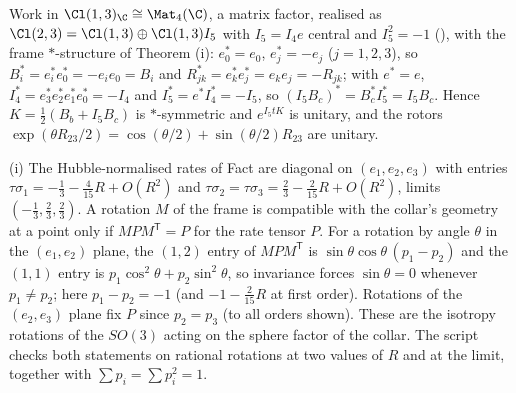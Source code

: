 Work in $\Cl(1,3)_{\C} \cong \Mat_{4}(\C)$, a matrix factor, realised as $\Cl(2,3) = \Cl(1,3) \oplus \Cl(1,3)I_{5}$ with $I_{5} = I_{4}e$ central and $I_{5}^{2} = -1$ (), with the frame $*$-structure of Theorem (i): $e_{0}^{*} = e_{0}$, $e_{j}^{*} = -e_{j}$ ($j = 1, 2, 3$), so $B_{i}^{*} = e_{i}^{*}e_{0}^{*} = -e_{i}e_{0} = B_{i}$ and $R_{jk}^{*} = e_{k}^{*}e_{j}^{*} = e_{k}e_{j} = -R_{jk}$; with $e^{*} = e$, $I_{4}^{*} = e_{3}^{*}e_{2}^{*}e_{1}^{*}e_{0}^{*} = -I_{4}$ and $I_{5}^{*} = e^{*}I_{4}^{*} = -I_{5}$, so $(I_{5}B_{c})^{*} = B_{c}^{*}I_{5}^{*} = I_{5}B_{c}$. Hence $K = \tfrac12(B_{b} + I_{5}B_{c})$ is $*$-symmetric and $e^{I_{5}tK}$ is unitary, and the rotors $\exp(\theta R_{23}/2) = \cos(\theta/2) + \sin(\theta/2)R_{23}$ are unitary.

(i) The Hubble-normalised rates of Fact  are diagonal on $(e_{1}, e_{2}, e_{3})$ with entries $\tau\sigma_{1} = -\tfrac13 - \tfrac{4}{15}R + O(R^{2})$ and $\tau\sigma_{2} = \tau\sigma_{3} = \tfrac23 - \tfrac{2}{15}R + O(R^{2})$, limits $(-\tfrac13, \tfrac23, \tfrac23)$. A rotation $M$ of the frame is compatible with the collar's geometry at a point only if $MPM^{\mathsf T} = P$ for the rate tensor $P$. For a rotation by angle $\theta$ in the $(e_{1}, e_{2})$ plane, the $(1,2)$ entry of $MPM^{\mathsf T}$ is $\sin\theta\cos\theta\,(p_{1} - p_{2})$ and the $(1,1)$ entry is $p_{1}\cos^{2}\theta + p_{2}\sin^{2}\theta$, so invariance forces $\sin\theta = 0$ whenever $p_{1} \ne p_{2}$; here $p_{1} - p_{2} = -1$ (and $-1 - \tfrac{2}{15}R$ at first order). Rotations of the $(e_{2}, e_{3})$ plane fix $P$ since $p_{2} = p_{3}$ (to all orders shown). These are the isotropy rotations of the $SO(3)$ acting on the sphere factor of the collar. The script checks both statements on rational rotations at two values of $R$ and at the limit, together with $\sum p_{i} = \sum p_{i}^{2} = 1$.

